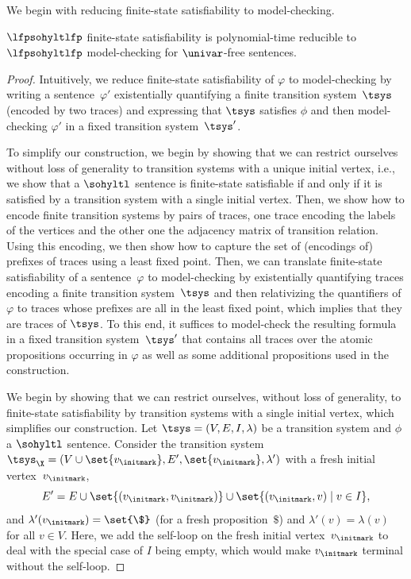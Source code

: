 We begin with reducing finite-state satisfiability to model-checking.

\begin{lem}
\label{lemma_fssat2mc}
$\lfpsohyltlfp$ finite-state satisfiability is polynomial-time reducible to $\lfpsohyltlfp$ model-checking for $\univar$-free sentences.
\end{lem}

\begin{proof}
Intuitively, we reduce finite-state satisfiability of $\varphi$ to model-checking by writing a sentence~$\varphi'$ existentially quantifying a finite transition system~$\tsys$ (encoded by two traces) and expressing that $\tsys$ satisfies $\phi$ and then model-checking $\varphi'$ in a fixed transition system~$\tsys'$. 

To simplify our construction, we begin by showing that we can restrict ourselves without loss of generality to transition systems with a unique initial vertex, i.e., we show that a $\sohyltl$ sentence is finite-state satisfiable if and only if it is satisfied by a transition system with a single initial vertex.
Then, we show how to encode finite transition systems by pairs of traces,  one trace encoding the labels of the vertices and the other one the adjacency matrix of transition relation. 
Using this encoding, we then show how to capture the set of (encodings of) prefixes of traces using a least fixed point.
Then, we can translate finite-state satisfiability of a sentence~$\varphi$ to model-checking by existentially quantifying traces encoding a finite transition system~$\tsys$ and then relativizing the quantifiers of $\varphi$ to traces whose prefixes are all in the least fixed point, which implies that they are traces of $\tsys$.
To this end, it suffices to model-check the resulting formula in a fixed transition system~$\tsys'$ that contains all traces over the atomic propositions occurring in $\varphi$ as well as some additional propositions used in the construction.

We begin by showing that we can restrict ourselves, without loss of generality, to finite-state satisfiability by transition systems with a single initial vertex, which simplifies our construction.
Let $\tsys = (V, E, I, \lambda)$ be a transition system and $\phi$ a $\sohyltl$ sentence.
Consider the transition system~$\tsys_{\X} = (V\cup\set{v_\initmark}, E', \set{v_\initmark}, \lambda')$ with a fresh initial vertex~$v_\initmark$,
\[
E' = E \cup \set{(v_\initmark, v_\initmark)} \cup \set{(v_\initmark, v) \mid v \in I},
\]
and $\lambda'(v_\initmark) = \set{\$}$ (for a fresh proposition~$\$$) and $\lambda'(v) = \lambda(v)$ for all $v \in V$.
Here, we add the self-loop on the fresh initial vertex~$v_\initmark$ to deal with the special case of $I$ being empty, which would make $v_\initmark$ terminal without the self-loop.


\end{proof}
